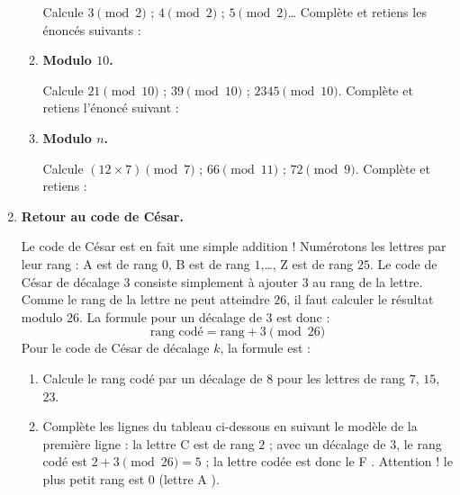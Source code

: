 \documentclass[class=report,crop=false, 12pt]{standalone}
\begin{document}
\begin{activite}[Modulo]
\begin{enumerate}
\begin{enumerate}
    Calcule $3 \pmod{2}$ ; $4 \pmod{2}$ ; $5 \pmod{2}$\ldots{} 
    Complète et retiens les énoncés suivants :
    
    
           
    \item \textbf{Modulo $10$.}
    
    Calcule $21 \pmod{10}$ ; $39 \pmod{10}$ ; $2345 \pmod{10}$.
    Complète et retiens l'énoncé suivant :
    
    
    \item \textbf{Modulo $n$.}
    
    Calcule $(12\times 7) \pmod{7}$ ; $66 \pmod{11}$ ; $72 \pmod{9}$.
    Complète et retiens :
    
    
   \end{enumerate}
   
   
   \item \textbf{Retour au code de César.}  
   
   Le code de César est en fait une simple addition ! Numérotons les lettres par leur rang :
   \og A \fg{} est de rang $0$, \og B \fg{} est de rang $1$,\ldots, \og Z \fg{} est de rang $25$.
   Le code de César de décalage $3$ consiste simplement à ajouter $3$ au rang de la lettre. Comme le rang de la lettre ne peut atteindre $26$, il faut calculer le résultat modulo $26$.
   La formule pour un décalage de $3$ est donc :
   $$\text{rang codé} = \text{rang} + 3 \pmod{26}$$
   Pour le code de César de décalage $k$, la formule est :

  
   \begin{enumerate}
     \item Calcule le rang codé par un décalage de $8$ pour les lettres de rang $7$, $15$, $23$.
     \item Complète les lignes du tableau ci-dessous
     en suivant le modèle de la première ligne :
     la lettre \og C \fg{} est de rang $2$ ; avec un décalage de $3$, le rang codé est $2+3\pmod{26}=5$ ; la lettre codée est donc le \og F \fg{}. Attention ! le plus petit rang est $0$ (lettre \og A \fg{}).
     

\end{enumerate}
\end{enumerate}
\end{activite}
\end{document}
